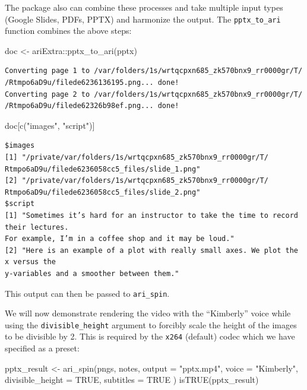 The  package also can combine these processes and take
multiple input types (Google Slides, PDFs, PPTX) and harmonize the
output. The \texttt{pptx\_to\_ari} function combines the above steps:

\begin{Schunk}
\begin{Sinput}
doc <- ariExtra::pptx_to_ari(pptx)
\end{Sinput}
\end{Schunk}

\begin{verbatim}
Converting page 1 to /var/folders/1s/wrtqcpxn685_zk570bnx9_rr0000gr/T/
/Rtmpo6aD9u/filede6236136195.png... done!
Converting page 2 to /var/folders/1s/wrtqcpxn685_zk570bnx9_rr0000gr/T/
/Rtmpo6aD9u/filede62326b98ef.png... done!
\end{verbatim}

\begin{Schunk}
\begin{Sinput}
doc[c("images", "script")]
\end{Sinput}
\end{Schunk}

\begin{verbatim}
$images
[1] "/private/var/folders/1s/wrtqcpxn685_zk570bnx9_rr0000gr/T/
Rtmpo6aD9u/filede6236058cc5_files/slide_1.png"
[2] "/private/var/folders/1s/wrtqcpxn685_zk570bnx9_rr0000gr/T/
Rtmpo6aD9u/filede6236058cc5_files/slide_2.png"
$script
[1] "Sometimes it’s hard for an instructor to take the time to record their lectures. 
For example, I’m in a coffee shop and it may be loud."
[2] "Here is an example of a plot with really small axes. We plot the x versus the 
y-variables and a smoother between them."
\end{verbatim}

This output can then be passed to \texttt{ari\_spin}.

We will now demonstrate rendering the video with the ``Kimberly'' voice
while using the \texttt{divisible\_height} argument to forcibly scale
the height of the images to be divisible by 2. This is required by the
\texttt{x264} (default) codec which we have specified as a preset:

\newpage

\begin{Schunk}
\begin{Sinput}
pptx_result <- ari_spin(pngs, notes,
  output = "pptx.mp4", voice = "Kimberly",
  divisible_height = TRUE, subtitles = TRUE
)
isTRUE(pptx_result)
\end{Sinput}
\end{Schunk}

